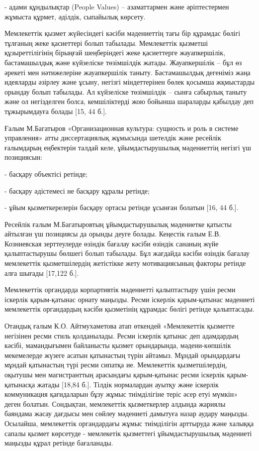 - адами құндылықтар (People Values) -- азаматтармен және әріптестермен
жұмыста құрмет, әділдік, сыпайылық көрсету.

Мемлекеттік қызмет жүйесіндегі кәсіби мәдениеттің тағы бір құрамдас
бөлігі тұлғаның жеке қасиеттері болып табылады. Мемлекеттік қызметші
құзыреттілігінің бірыңғай шеңберіндегі жеке қасиеттерге жауапкершілік,
бастамашылдық және күйзеліске төзімшілдік жатады. Жауапкершілік -- бұл
өз әрекеті мен нәтижелеріне жауапкершілік таныту. Бастамашылдық
дегеніміз жаңа идеяларды әзірлеу және ұсыну, негізгі міндеттерінен бөлек
қосымша жқмыстарды орындау болып табылады. Ал күйзеліске төзімшілдік --
сынға сабырлық таныту және ол негізделген болса, кемшіліктерді жою
бойынша шараларды қабылдау деп тұжырымдауға болады {[}15, 44 б.{]}.

Ғалым М.Багатыров «Организационная культура: сущность и роль в системе
управления» атты диссертациялық жұмысында шетелдік және ресейлік
ғалымдарың еңбектерін талдай келе, ұйымдастырушылық мәдениеттің негізгі
үш позициясын:

- басқару объектісі ретінде;

- басқару әдістемесі не басқару құралы ретінде;

- ұйым қызметкерелерін басқару ортасы ретінде ұсынған болатын {[}16, 44
б.{]}.

Ресейлік ғалым М.Багатыровтың ұйымдастырушылық мәдениетке қатысты
айтылған үш позициясы да орынды деуге болады. Кеңестік ғалым Е.В.
Козниевская зерттеулерде өзіндік бағалау кәсіби өзіндік сананың жүйе
қалыптастырушы бөлшегі болып табылады. Бұл жағдайда кәсіби өзіндік
бағалау мемлекеттік қызметшілердің жетістікке жету мотивациясының
факторы ретінде алға шығады {[}17,122 б.{]}.

Мемлекеттік органдарда корпартивтік мәдениетті қалыптастыру үшін ресми
іскерлік қарым-қатынас орнату маңызды. Ресми іскерлік қарым-қатынас
мәдениеті мемлекеттік органдардың кәсіби қызметінің құрамдас бөлігі
ретінде қалыптасады.

Отандық ғалым К.О. Айтмухаметова атап өткендей «Мемлекеттік қызметте
негізінен ресми стиль қолданылады. Ресми іскерлік қатынас деп адамдардың
кәсібі, мамандығымен байланысты қызмет орындарында, мәдени-көпшілік
мекемелерде жүзеге асатын қатынастың түрін айтамыз. Мұндай орындардағы
мұндай қатынастың түрі ресми сипатқа ие. Мемлекеттік қызметшілердің,
оқытушы мен магистранттың арасындағы қарым-қатынас ресми іскерлік
қарым-қатынасқа жатады {[}18,84 б.{]}. Тілдік нормалардан ауытқу және
іскерлік коммуникация қағидаларын бұзу жұмыс тиімділігіне теріс әсер
етуі мүмкін» деген болатын. Сондықтан, мемлекеттік қызметкерлер алдында
жариялы баяндама жасау дағдысы мен сөйлеу мәдениеті дамытуға назар
аудару маңызды. Осылайша, мемлекеттік органдардағы жұмыс тиімділігін
арттыруда және халыққа сапалы қызмет көрсетуде - мемлекетік қызметтегі
ұйымдастырушылық мәдениеті маңызды құрал ретінде бағаланады.

